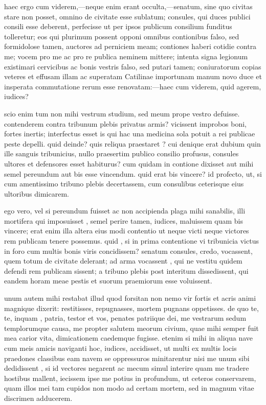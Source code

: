  haec ergo cum viderem,—neque enim erant occulta,—senatum, sine quo civitas stare non posset, omnino de civitate esse sublatum; consules, qui duces publici consili esse deberent, perfecisse ut per ipsos publicum consilium funditus tolleretur; eos qui plurimum possent opponi omnibus contionibus falso, sed formidolose tamen, auctores ad perniciem meam; contiones haberi cotidie contra me; vocem pro me ac pro re publica neminem mittere; intenta signa legionum existimari cervicibus ac bonis vestris falso, sed putari tamen; coniuratorum copias veteres et effusam illam ac superatam Catilinae importunam manum novo duce et insperata commutatione rerum esse renovatam:—haec cum viderem, quid agerem, iudices?

 scio enim tum non mihi vestrum studium, sed meum prope vestro defuisse. contenderem contra tribunum plebis privatus armis? vicissent improbos boni, fortes inertis; interfectus esset is qui hac una medicina sola potuit a rei publicae peste depelli. quid deinde? quis reliqua praestaret ? cui denique erat dubium quin ille sanguis tribunicius, nullo praesertim publico consilio profusus, consules ultores et defensores esset habiturus? cum quidam in contione dixisset aut mihi semel pereundum aut bis esse vincendum. quid erat bis vincere? id profecto, ut, si cum amentissimo tribuno plebis decertassem, cum consulibus ceterisque eius ultoribus dimicarem.

 ego vero, vel si pereundum fuisset ac non accipienda plaga mihi sanabilis, illi mortifera qui imposuisset , semel perire tamen, iudices, maluissem quam bis vincere; erat enim illa altera eius modi contentio ut neque victi neque victores rem publicam tenere possemus. quid , si in prima contentione vi tribunicia victus in foro cum multis bonis viris concidissem? senatum consules, credo, vocassent, quem totum de civitate delerant; ad arma vocassent , qui ne vestitu quidem defendi rem publicam sissent; a tribuno plebis post interitum dissedissent, qui eandem horam meae pestis et suorum praemiorum esse voluissent.

 unum autem mihi restabat illud quod forsitan non nemo vir fortis et acris animi magnique dixerit: restitisses, repugnasses, mortem pugnans oppetisses. de quo te, te, inquam , patria, testor et vos, penates patriique dei, me vestrarum sedum templorumque causa, me propter salutem meorum civium, quae mihi semper fuit mea carior vita, dimicationem caedemque fugisse. etenim si mihi in aliqua nave cum meis amicis naviganti hoc, iudices, accidisset, ut multi ex multis locis praedones classibus eam navem se oppressuros minitarentur nisi me unum sibi dedidissent , si id vectores negarent ac mecum simul interire quam me tradere hostibus mallent, iecissem ipse me potius in profundum, ut ceteros conservarem, quam illos mei tam cupidos non modo ad certam mortem, sed in magnum vitae discrimen adducerem.

